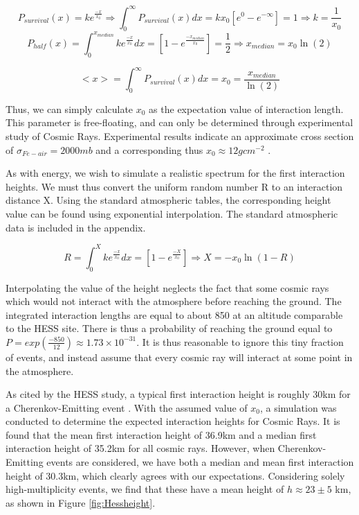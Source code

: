 \documentclass{article}
\begin{document}
\[ P_{survival}(x) = k e^{\frac{-x}{x_{0}}} \Longrightarrow \int_{0}^{\infty} P_{survival}(x) dx = k x_{0} [ e^{0} - e ^ {- \infty}] = 1 \Longrightarrow k = \frac{1}{x_{0}}\]
\[P_{half}(x) =\int_{0}^{x_{median}} k e^{\frac{-x}{x_{0}}} dx =[1 -e^{\frac{-x_{median}}{x_{0}}} ]= \frac{1}{2} \Longrightarrow {x_{median}} = x_{0} \ln (2)\]

\[ <x> =  \int_{0}^{\infty} P_{survival}(x) dx = x_{0} = \frac{x_{median}}{\ln (2)} \]

Thus, we can simply calculate $x_{0}$ as the expectation value of interaction length. This parameter is free-floating, and can only be determined through experimental study of Cosmic Rays. Experimental results indicate an approximate cross section of $\sigma_{Fe-air} = 2000mb$ and a corresponding thus $x_{0} \approx 12 g cm^{-2}$ \cite{Montanus2013}. 

As with energy, we wish to simulate a realistic spectrum for the first interaction heights. We must thus convert the uniform random number R to an interaction distance X. Using the standard atmospheric tables, the corresponding height value can be found using exponential interpolation. The standard atmospheric data is included in the appendix.

\[ R = \int_{0}^{X} k e^{\frac{-x}{x_{0}}} dx = [1 -e^{\frac{-X}{x_{0}}}] \Longrightarrow X = -x_{0} \ln (1 - R) \] 

Interpolating the value of the height neglects the fact that some cosmic rays which would not interact with the atmosphere before reaching the ground. The integrated interaction lengths are equal to about 850 at an altitude comparable to the HESS site. There is thus a probability of reaching the ground equal to $P = exp(\frac{-850}{12}) \approx 1.73 \times 10 ^{-31}$. It is thus reasonable to ignore this tiny fraction of events, and instead assume that every cosmic ray will interact at some point in the atmosphere.

As cited by the HESS study, a typical first interaction height is roughly 30km for a Cherenkov-Emitting event \cite{hess07}. With the assumed value of $x_{0}$, a simulation was conducted to determine the expected interaction heights for Cosmic Rays. It is found that the mean first interaction height of 36.9km and a median first interaction height of 35.2km for all cosmic rays. However, when Cherenkov-Emitting events are considered, we have both a median and mean first interaction height of 30.3km, which clearly agrees with our expectations. Considering solely high-multiplicity events, we find that these have a mean height of $h \approx 23 \pm 5$ km, as shown in Figure \ref{fig:Hessheight}.
\end{document}
